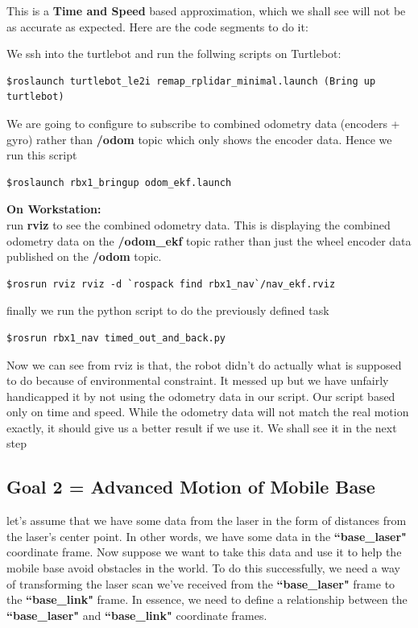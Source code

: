 \documentclass[10pt,a4paper]{article}
\begin{document}
This is a \textbf{Time and Speed} based approximation, which we shall see will not be as accurate as expected. Here are the code segments to do it:

We ssh into the turtlebot and run the follwing scripts
on Turtlebot:
\begin{lstlisting}[frame=single] 
$roslaunch turtlebot_le2i remap_rplidar_minimal.launch (Bring up turtlebot)
\end{lstlisting}
We are going to configure to subscribe to combined odometry data (encoders + gyro) 
rather than \textbf{/odom} topic which only shows the encoder data. Hence we run this script
\begin{lstlisting}[frame=single] 
$roslaunch rbx1_bringup odom_ekf.launch
\end{lstlisting}

\textbf{On Workstation:}\\
run \textbf{rviz} to see the combined odometry data. This is displaying the combined odometry data on the \textbf{/odom\_ekf} topic rather than just the wheel encoder data published on the \textbf{/odom} topic.
\begin{lstlisting}[frame=single] 
$rosrun rviz rviz -d `rospack find rbx1_nav`/nav_ekf.rviz
\end{lstlisting}
finally we run the python script to do the previously defined task 
\begin{lstlisting}[frame=single] 
$rosrun rbx1_nav timed_out_and_back.py
\end{lstlisting}

Now we can see from rviz is that, the robot didn't do actually what is supposed to do
because of environmental constraint. It messed up but we have unfairly handicapped it 
by not using the odometry data in our script. Our script based only on time and speed. 
While the odometry data will not match the real motion exactly, 
it should give us a better result if we use it. We shall see it in the next step

\subsection{Goal 2 = Advanced Motion of Mobile Base}
let's assume that we have some data from the laser in the form of distances from the laser's center point. In other words, we have some data in the \textbf{``base\_laser"} coordinate frame. Now suppose we want to take this data and use it to help the mobile base avoid obstacles in the world. To do this successfully, we need a way of transforming the laser scan we've received from the \textbf{``base\_laser"} frame to the \textbf{``base\_link"} frame. In essence, we need to define a relationship between the \textbf{``base\_laser"} and \textbf{``base\_link"} coordinate frames.\\
\end{document}
